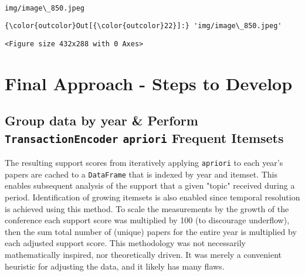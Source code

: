 \documentclass[11pt]{article}
\begin{document}
    \begin{center}
    \end{center}
    { \hspace*{\fill} \\}
    
    \begin{Verbatim}[commandchars=\\\{\}]
img/image\_850.jpeg

    \end{Verbatim}

\begin{Verbatim}[commandchars=\\\{\}]
{\color{outcolor}Out[{\color{outcolor}22}]:} 'img/image\_850.jpeg'
\end{Verbatim}
            
    
    \begin{verbatim}
<Figure size 432x288 with 0 Axes>
    \end{verbatim}

    
    \section{Final Approach - Steps to
Develop}\label{final-approach---steps-to-develop}

\subsection{\texorpdfstring{Group data by year \& Perform
\texttt{TransactionEncoder} \texttt{apriori} Frequent
Itemsets}{Group data by year \& Perform TransactionEncoder apriori Frequent Itemsets}}\label{group-data-by-year-perform-transactionencoder-apriori-frequent-itemsets}

The resulting support scores from iteratively applying \texttt{apriori}
to each year's papers are cached to a \texttt{DataFrame} that is indexed
by year and itemset. This enables subsequent analysis of the support
that a given "topic" received during a period. Identification of growing
itemsets is also enabled since temporal resolution is achieved using
this method. To scale the measurements by the growth of the conference
each support score was multiplied by 100 (to discourage underflow), then
the sum total number of (unique) papers for the entire year is
multiplied by each adjusted support score. This methodology was not
necessarily mathematically inspired, nor theoretically driven. It was
merely a convenient heuristic for adjusting the data, and it likely has
many flaws.
\end{document}
